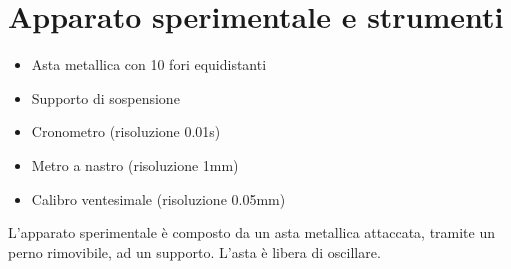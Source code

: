\documentclass{article}
\begin{document}
		\section{Apparato sperimentale e strumenti}
			\begin{itemize}
				\item Asta metallica con 10 fori equidistanti
				\item Supporto di sospensione
				\item Cronometro (risoluzione 0.01s)
				\item Metro a nastro (risoluzione 1mm)
				\item Calibro ventesimale (risoluzione 0.05mm)
			\end{itemize}
			L'apparato sperimentale \`{e} composto da un asta metallica attaccata, tramite un perno rimovibile, ad un supporto. L'asta \`{e} libera di oscillare.
			
\end{document}
